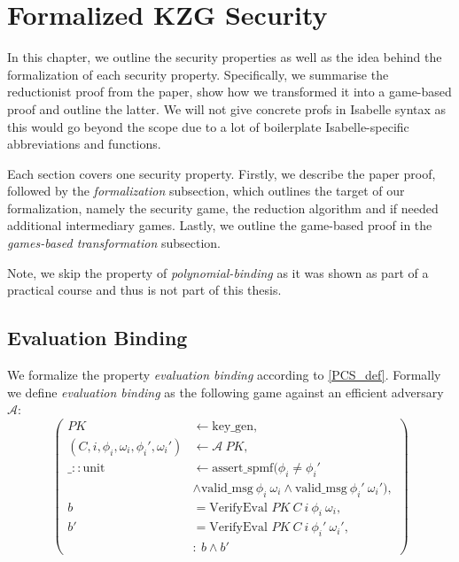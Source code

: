 \chapter{Formalized KZG Security}\label{chapter:security}
In this chapter, we outline the security properties as well as the idea behind the formalization of each security property. Specifically, we summarise the reductionist proof from the paper, show how we transformed it into a game-based proof and outline the latter. We will not give concrete profs in Isabelle syntax as this would go beyond the scope due to a lot of boilerplate Isabelle-specific abbreviations and functions.

Each section covers one security property. Firstly, we describe the paper proof, followed by the \textit{formalization} subsection, which outlines the target of our formalization, namely the security game, the reduction algorithm and if needed additional intermediary games. Lastly, we outline the game-based proof in the \textit{games-based transformation} subsection.

Note, we skip the property of \textit{polynomial-binding} as it was shown as part of a practical course and thus is not part of this thesis.

\section{Evaluation Binding}
\label{security:binding}
We formalize the property \textit{evaluation binding} according to \ref{PCS_def}. Formally we define \textit{evaluation binding} as the following game against an efficient adversary $\mathcal{A}$: 
\begin{equation*}
    \left(
        \begin{aligned}
            PK & \leftarrow \text{key\_gen}, \\
            (C, i,\phi_i,\omega_i, \phi_i',\omega_i') & \leftarrow \mathcal{A} \ PK, \\
            \_::\text{unit} & \leftarrow \text{assert\_spmf}(\phi_i \ne \phi_i' \\
            &\land \text{valid\_msg}\ \phi_i\ \omega_i \land \text{valid\_msg}\ \phi_i'\ \omega_i'), \\
            b &= \text{VerifyEval } PK\ C\ i\ \phi_i\ \omega_i,\\
            b' &= \text{VerifyEval } PK\ C\ i\ \phi_i'\ \omega_i',\\
            & : \ b \land b'
        \end{aligned}
        \right)
\end{equation*}

